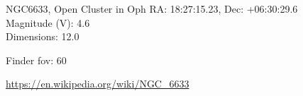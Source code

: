 \begin{block}{NGC6633, Open Cluster in Oph}
    RA: 18:27:15.23, Dec: +06:30:29.6 \\ 
    Magnitude (V): 4.6 \\ 
    Dimensions: 12.0 

    Finder fov: 60 

    \url{https://en.wikipedia.org/wiki/NGC_6633} 
\end{block}